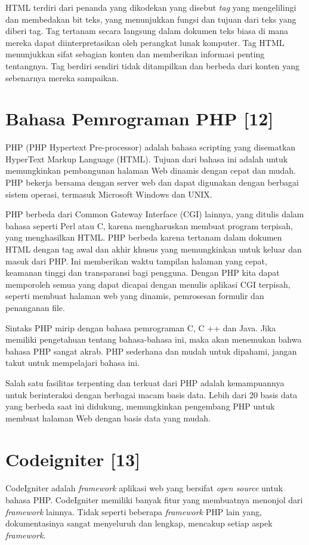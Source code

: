 HTML terdiri dari penanda yang dikodekan yang disebut \textit{tag} yang mengelilingi dan membedakan bit teks, yang menunjukkan fungsi dan tujuan dari teks yang diberi tag. Tag tertanam secara langsung dalam dokumen teks biasa di mana mereka dapat diinterpretasikan oleh perangkat lunak komputer. Tag HTML menunjukkan sifat sebagian konten dan memberikan informasi penting tentangnya. Tag berdiri sendiri tidak ditampilkan dan berbeda dari konten yang sebenarnya mereka sampaikan.

\section{Bahasa Pemrograman PHP [12]}
\label{php}
PHP (PHP Hypertext Pre-processor) adalah bahasa scripting yang disematkan HyperText Markup Language (HTML). Tujuan dari bahasa ini adalah untuk memungkinkan pembangunan halaman Web dinamis dengan cepat dan mudah. PHP bekerja bersama dengan server web dan dapat digunakan dengan berbagai sistem operasi, termasuk Microsoft Windows dan UNIX.

PHP berbeda dari Common Gateway Interface (CGI) lainnya, yang ditulis dalam bahasa seperti Perl atau C, karena mengharuskan membuat program terpisah, yang menghasilkan HTML. PHP berbeda karena tertanam dalam dokumen HTML dengan tag awal dan akhir khusus yang memungkinkan untuk keluar dan masuk dari PHP. Ini memberikan waktu tampilan halaman yang cepat, keamanan tinggi dan transparansi bagi pengguna. Dengan PHP kita dapat memporoleh semua yang dapat dicapai dengan menulis aplikasi CGI terpisah, seperti membuat halaman web yang dinamis, pemrosesan formulir dan penanganan file.

Sintaks PHP mirip dengan bahasa pemrograman C, C ++ dan Java. Jika  memiliki pengetahuan tentang bahasa-bahasa ini, maka akan menemukan bahwa bahasa PHP sangat akrab. PHP sederhana dan mudah untuk dipahami, jangan takut untuk mempelajari bahasa ini.

Salah satu fasilitas terpenting dan terkuat dari PHP adalah kemampuannya untuk berinteraksi dengan berbagai macam basis data. Lebih dari 20 basis data yang berbeda saat ini didukung, memungkinkan pengembang PHP untuk membuat halaman Web dengan basis data yang mudah. 

\section{Codeigniter [13]}
\label{ci}
\paragraph{}
CodeIgniter adalah \textit{framework} aplikasi web yang bersifat \textit{open source} untuk bahasa PHP. CodeIgniter memiliki banyak fitur yang membuatnya menonjol dari \textit{framework} lainnya. Tidak seperti beberapa \textit{framework} PHP lain yang, dokumentasinya sangat menyeluruh dan lengkap, mencakup setiap aspek \textit{framework}. 

